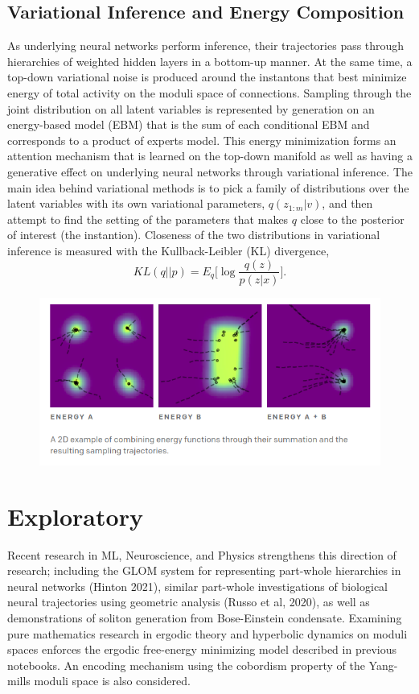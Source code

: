 \documentclass{article}
\begin{document}
\subsection{Variational Inference and Energy Composition}
    As underlying neural networks perform inference, their trajectories pass through hierarchies of weighted hidden layers in a bottom-up manner. At the same time, a top-down variational noise is produced around the instantons that best minimize energy of total activity on the moduli space of connections. Sampling through the joint distribution on all latent variables is represented by generation on an energy-based model (EBM) that is the sum of each conditional EBM and corresponds to a product of experts model. This energy minimization forms an attention mechanism that is learned on the top-down manifold as well as having a generative effect on underlying neural networks through variational inference. The main idea behind variational methods is to pick a family of distributions over the latent variables with its own variational parameters, $q(z_{1:m} | v)$, and then attempt to find the setting of the parameters that makes $q$ close to the posterior of interest (the instantion). Closeness of the two distributions in variational inference is measured with the Kullback-Leibler (KL) divergence, 
    \[
        KL(q||p)=  E_q\bigg[ \log \frac{ q(z)}{p(z | x)} \bigg].
    \]
    \begin{figure}[H]
        \centering
        \includegraphics[width=13cm]{openai-ebm.png}
    \end{figure}
    
\section{Exploratory }
    Recent research in ML, Neuroscience, and Physics strengthens this direction of research; including the GLOM system for representing part-whole hierarchies in neural networks (Hinton 2021), similar part-whole investigations of biological neural trajectories using geometric analysis (Russo et al, 2020), as well as demonstrations of soliton generation from Bose-Einstein condensate. Examining pure mathematics research in ergodic theory and hyperbolic dynamics on moduli spaces enforces the ergodic free-energy minimizing model described in previous notebooks. An encoding mechanism using the cobordism property of the Yang-mills moduli space is also considered.
    
\end{document}
